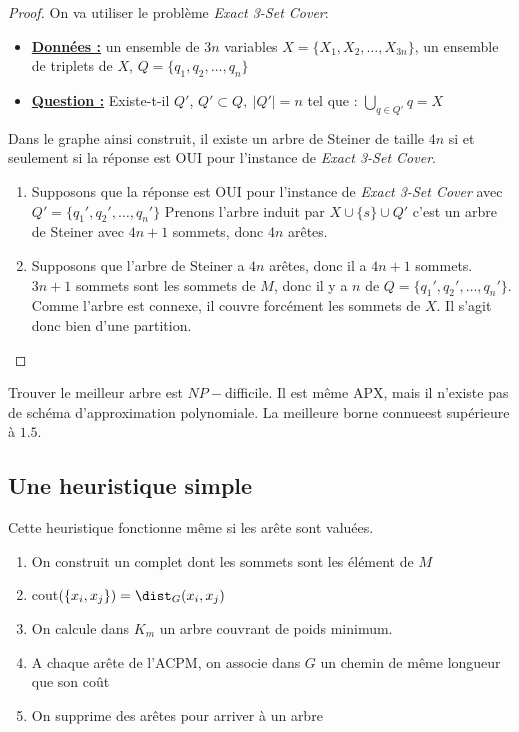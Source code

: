 \documentclass[a4paper,11pt]{thesis}
\begin{document}
\begin{proof}
    On va utiliser le problème \emph{Exact 3-Set Cover}:
    \begin{itemize}
        \item[] \textbf{\underline{Données :}} un ensemble de $3n$ variables $X = \{X_1, X_2, \dots,
            X_{3n}\}$, un ensemble de triplets de $X$, $Q = \{q_1, q_2, \dots, q_n\}$
        \item[] \textbf{\underline{Question :}} Existe-t-il $Q'$, $Q' \subset Q,\ |Q'| = n$ tel que
            : $\bigcup_{q \in Q'} q = X$
    \end{itemize}
    Dans le graphe ainsi construit, il existe un arbre de Steiner de taille $4n$ si et seulement si
    la réponse est OUI pour l'instance de \emph{Exact 3-Set Cover}.

    \begin{enumerate}
        \item Supposons que la réponse est OUI pour l'instance de \emph{Exact 3-Set Cover} avec $Q'
            = \{q_1', q_2', \dots, q_n'\}$ Prenons l'arbre induit par $X \cup \{s\} \cup Q'$ c'est
            un arbre de Steiner avec $4n + 1$ sommets, donc $4n$ arêtes.
        \item Supposons que l'arbre de Steiner a $4n$ arêtes, donc il a $4n + 1$ sommets. $3n + 1$
            sommets sont les sommets de $M$, donc il y a $n$ de $Q = \{q_1', q_2', \dots, q_n'\}$.
            Comme l'arbre est connexe, il couvre forcément les sommets de $X$. Il s'agit donc bien
            d'une partition.
    \end{enumerate}
\end{proof}

Trouver le meilleur arbre est $NP-$difficile. Il est même APX, mais il n'existe pas de schéma
d'approximation polynomiale. La meilleure borne connueest supérieure à $1.5$.

\subsection{Une heuristique simple}

Cette heuristique fonctionne même si les arête sont valuées.

\begin{enumerate}
    \item On construit un complet dont les sommets sont les élément de $M$
    \item cout$(\{x_i, x_j\}) = \dist_G(x_i, x_j)$
    \item On calcule dans $K_m$ un arbre couvrant de poids minimum.
    \item A chaque arête de l'ACPM, on associe dans $G$ un chemin de même longueur que son coût
    \item On supprime des arêtes pour arriver à un arbre
\end{enumerate}
\end{document}
